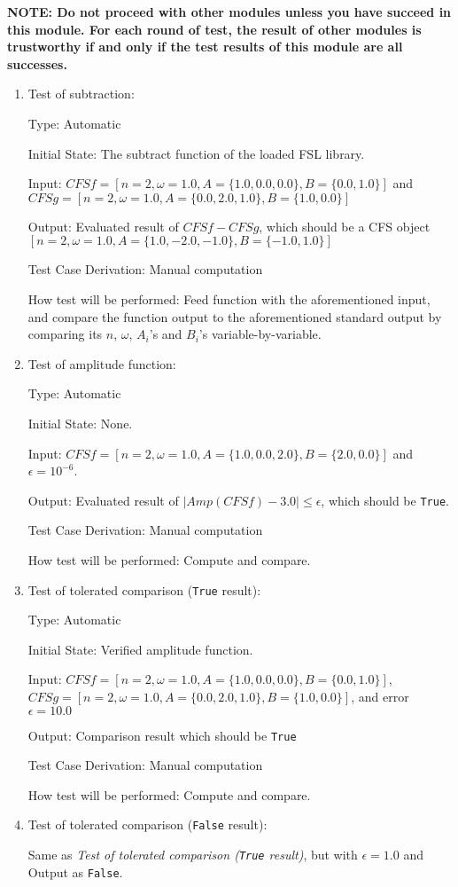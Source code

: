 \documentclass[12pt, titlepage]{article}
\newcommand{\li}[1]{\texttt{#1}}
\begin{document}
\textbf{NOTE: Do not proceed with other modules unless you have succeed in this module. For each round of test, the result of other modules is trustworthy if and only if the test results of this module are all successes.}

\begin{enumerate}
	
	\item{Test of subtraction: \\}
	
	Type: Automatic
	
	Initial State: The subtract function of the loaded FSL library.
	
	Input: $\mathit{CFSf}=[n=2, \omega=1.0, A=\{1.0, 0.0, 0.0\}, B=\{0.0, 1.0\}]$ and 
	$\mathit{CFSg}=[n=2, \omega=1.0, A=\{0.0, 2.0, 1.0\}, B=\{1.0, 0.0\}]$	 
	
	Output: Evaluated result of $\mathit{CFSf}-\mathit{CFSg}$, which should be a CFS object $[n=2, \omega=1.0, A=\{1.0, -2.0, -1.0\}, B=\{-1.0, 1.0\}]$
	
	Test Case Derivation: Manual computation
	
	How test will be performed: Feed function with the aforementioned input, and compare the function output to the aforementioned standard output by comparing its $n$, $\omega$, $A_i$'s and $B_i$'s variable-by-variable.
	
	\item{Test of amplitude function: \\}					
	
	Type: Automatic
	
	Initial State: None.
	
	Input: $\mathit{CFSf}=[n=2, \omega=1.0, A=\{1.0, 0.0, 2.0\}, B=\{2.0, 0.0\}]$ and $\epsilon=10^{-6}$.
	
	Output: Evaluated result of $|\mathit{Amp}(\mathit{CFSf})-3.0|\leq\epsilon$, which should be \li{True}.
	
	Test Case Derivation: Manual computation
	
	How test will be performed: Compute and compare.
	
	
	\item{Test of tolerated comparison  (\li{True} result): \\}
	
	Type: Automatic
	
	Initial State: Verified amplitude function.
	
	Input: $\mathit{CFSf}=[n=2, \omega=1.0, A=\{1.0, 0.0, 0.0\}, B=\{0.0, 1.0\}]$, 
	$\mathit{CFSg}=[n=2, \omega=1.0, A=\{0.0, 2.0, 1.0\}, B=\{1.0, 0.0\}]$, and error $\epsilon=10.0$
	
	Output: Comparison result which should be \li{True}
	
	Test Case Derivation: Manual computation
	
	How test will be performed: Compute and compare.
	
	\item{Test of tolerated comparison  (\li{False} result):\\}
	
	Same as \textit{Test of tolerated comparison  (\li{True} result)}, but with $\epsilon=1.0$ and Output as \li{False}.    
\end{enumerate}
\end{document}
